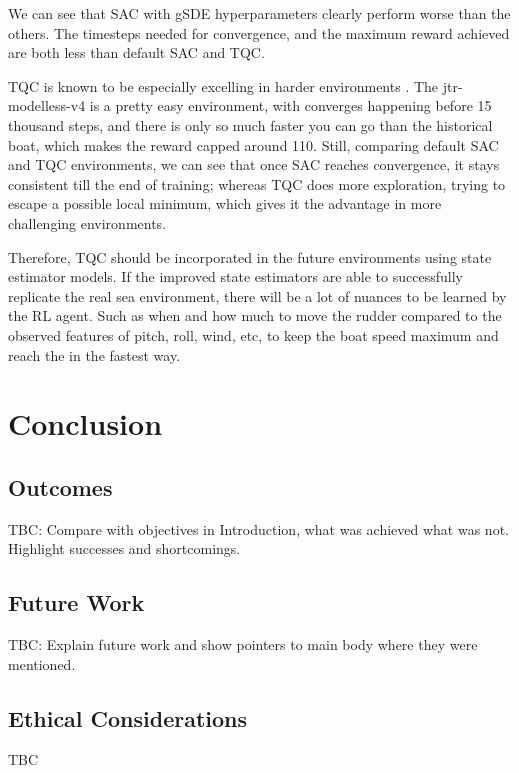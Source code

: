 \documentclass[12pt,twoside]{report}
\begin{document}
We can see that SAC with gSDE hyperparameters clearly perform worse than the others. The timesteps needed for convergence, and the maximum reward achieved are both less than default SAC and TQC. 

TQC is known to be especially excelling in harder environments \cite{tqc-paper}. The jtr-modelless-v4 is a pretty easy environment, with converges happening before 15 thousand steps, and there is only so much faster you can go than the historical boat, which makes the reward capped around 110. Still, comparing default SAC and TQC environments, we can see that once SAC reaches convergence, it stays consistent till the end of training; whereas TQC does more exploration, trying to escape a possible local minimum, which gives it the advantage in more challenging environments. 

Therefore, TQC should be incorporated in the future environments using state estimator models. If the improved state estimators are able to successfully replicate the real sea environment, there will be a lot of nuances to be learned by the RL agent. Such as when and how much to move the rudder compared to the observed features of pitch, roll, wind, etc, to keep the boat speed maximum and reach the in the fastest way.

\chapter{Conclusion}

\section{Outcomes}
TBC: Compare with objectives in Introduction, what was achieved what was not. Highlight successes and shortcomings.

\section{Future Work}
TBC: Explain future work and show pointers to main body where they were mentioned.

\section{Ethical Considerations}
TBC





\appendix
{}
\end{document}
